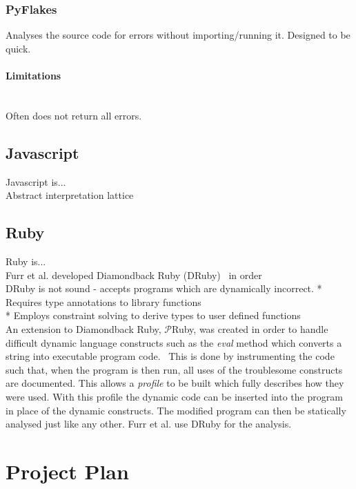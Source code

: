 \documentclass[12pt, titlepage]{article}
\begin{document}
\subsubsection{PyFlakes}
Analyses the source code for errors without importing/running it. Designed to be quick.
\paragraph{Limitations}\mbox{}\\
Often does not return all errors.

\subsection{Javascript}
Javascript is... \\
Abstract interpretation lattice \\


\subsection{Ruby}
Ruby is... \\
Furr et al. developed Diamondback Ruby (DRuby)~\cite{furr09} in order  \\
DRuby is not sound - accepts programs which are dynamically incorrect.
* Requires type annotations to library functions \\
* Employs constraint solving to derive types to user defined functions \\
An extension to Diamondback Ruby, $\mathcal{P}$Ruby, was created in order to handle difficult dynamic language constructs such as the \textit{eval} method which converts a string into executable program code.~\cite{pRuby} This is done by instrumenting the code such that, when the program is then run, all uses of the troublesome constructs are documented. This allows a \textit{profile} to be built which fully describes how they were used. With this profile the dynamic code can be inserted into the program in place of the dynamic constructs. The modified program can then be statically analysed just like any other. Furr et al. use DRuby for the analysis.

\section{Project Plan}
\end{document}
